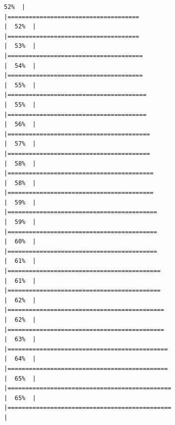 \documentclass[
  english,
  man,a4paper,mask,floatsintext]{apa6}
\begin{document}
\begin{verbatim}
52%  |                                                                              |=====================================                                 |  52%  |                                                                              |=====================================                                 |  53%  |                                                                              |======================================                                |  54%  |                                                                              |======================================                                |  55%  |                                                                              |=======================================                               |  55%  |                                                                              |=======================================                               |  56%  |                                                                              |========================================                              |  57%  |                                                                              |========================================                              |  58%  |                                                                              |=========================================                             |  58%  |                                                                              |=========================================                             |  59%  |                                                                              |==========================================                            |  59%  |                                                                              |==========================================                            |  60%  |                                                                              |==========================================                            |  61%  |                                                                              |===========================================                           |  61%  |                                                                              |===========================================                           |  62%  |                                                                              |============================================                          |  62%  |                                                                              |============================================                          |  63%  |                                                                              |=============================================                         |  64%  |                                                                              |=============================================                         |  65%  |                                                                              |==============================================                        |  65%  |                                                                              |==============================================                        |  
\end{verbatim}
\end{document}
